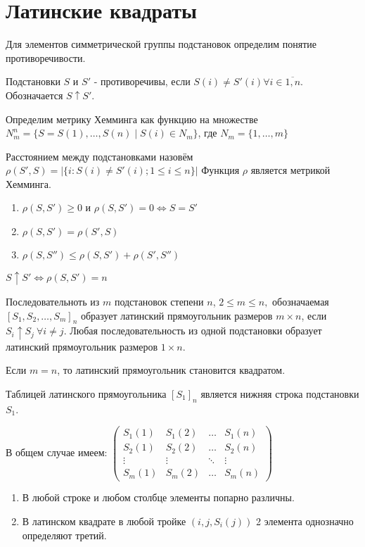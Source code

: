 \section{Латинские квадраты}

Для элементов симметрической группы подстановок определим понятие противоречивости.

\opr Подстановки $S$ и $S'$ - противоречивы, если $S(i) \neq S'(i) \forall i \in \overline{1,n}$. Обозначается $S\uparrow S'$.

Определим метрику Хемминга как функцию на множестве $N_m^n = \{ S = S(1), \dotsc,S(n) \mid S(i) \in N_m\}$, где $N_m = \{1, \ldots, m\}$\par
Расстоянием между подстановками назовём $\rho(S',S) = \left|\{i : S(i) \neq S'(i); 1 \leq i \leq n\}\right|$
Функция $\rho$ является метрикой Хемминга.

\prop
\begin{enumerate}
	\item $\rho(S,S') \geq 0$ и $\rho(S,S') = 0 \Leftrightarrow S = S'$
	\item $\rho(S,S') = \rho(S',S)$
	\item $\rho(S,S'') \leq \rho(S,S') + \rho(S',S'')$
\end{enumerate}

\utv $S \uparrow S' \Leftrightarrow \rho(S,S')=n$

\opr Последовательноть из $m$ подстановок степени $n$, $2\leq m\leq n,$ обозначаемая $[S_1, S_2, \dotsc, S_m]_n$ образует латинский прямоугольник размеров $m\times n$, если $S_i\uparrow S_j \:\forall i\neq j$.
Любая последовательность из одной подстановки образует латинский прямоугольник размеров $1\times n$.

Если $m=n$, то латинский прямоугольник становится квадратом.

Таблицей латинского прямоугольника $[S_1]_n$ является нижняя строка подстановки $S_1$. \par
В общем случае имеем:
$\begin{pmatrix}
S_1(1) & S_1(2) & \dotsc & S_1(n)\\
S_2(1) & S_2(2) & \dotsc & S_2(n)\\
\vdots & \vdots  & \ddots   & \vdots  \\
S_m(1) & S_m(2) & \dotsc & S_m(n)
\end{pmatrix}$\par

\prop
\begin{enumerate}
	\item В любой строке и любом столбце элементы попарно различны.
	\item В латинском квадрате в любой тройке $(i, j, S_i(j))$ 2 элемента однозначно определяют третий.
\end{enumerate}

